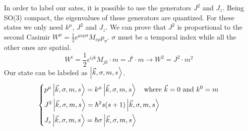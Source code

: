 \documentclass[../main.tex]{subfiles}
\begin{document}
In order to label our sates, it is possible to use the generators $J^2$ and $J_z$. Being SO(3) compact, the eigenvalues of these generators are quantized. For these states we only need $k^\mu$, $J^2$ and $J_z$. We can prove that $J^2$ is proportional to the second Casimir $W^\mu=\frac{1}{2}\epsilon^{\mu\nu\rho\sigma}M_{\nu\rho}p_\sigma$. $\sigma$ must be a temporal index while all the other ones are spatial.
\[
W^i=\frac{1}{2}\epsilon^{ijk}M_{jk}\cdot m=J^i\cdot m\xrightarrow[]{}W^2=J^2\cdot m^2
\]
Our state can be labeled as $\ket{\Vec{k},\sigma,m,s}$.
\[
\left\{
\begin{aligned}
&p^\mu\ket{\Vec{k},\sigma,m,s}=k^\mu\ket{\Vec{k},\sigma,m,s} \quad \text{where $\Vec{k}=0$ and $k^0=m$}\\
&J^2\ket{\Vec{k},\sigma,m,s}=\hbar^2s(s+1)\ket{\Vec{k},\sigma,m,s}\\
&J_z\ket{\Vec{k},\sigma,m,s}=\hbar\sigma\ket{\Vec{k},\sigma,m,s}
\end{aligned}
\right.
\]
\end{document}
